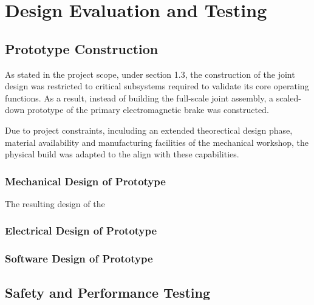 \chapter{Design Evaluation and Testing}

\section{Prototype Construction}

As stated in the project scope, under section 1.3, the construction of the joint design was restricted to critical subsystems required to validate its core operating functions. As a result, instead of building the full-scale joint assembly, a scaled-down prototype of the primary electromagnetic brake was constructed.

Due to project constraints, inculuding an extended theorectical design phase, material availability and manufacturing facilities of the mechanical workshop, the physical build was adapted to the align with these capabilities.

\subsection{Mechanical Design of Prototype}

The resulting design of the 

\subsection{Electrical Design of Prototype}


\subsection{Software Design of Prototype}


\section{Safety and Performance Testing}

